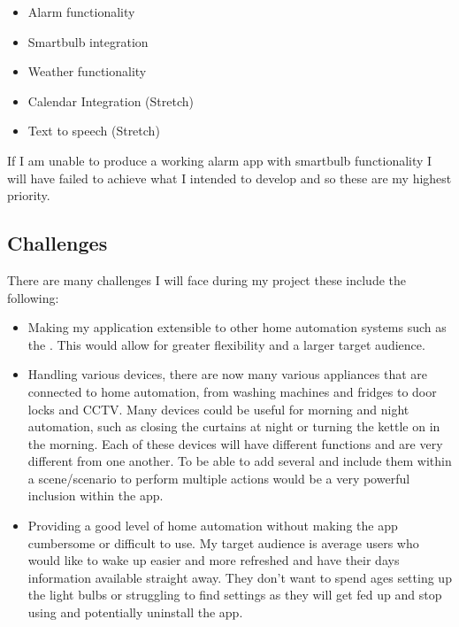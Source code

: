 \begin{itemize}
\tightlist
\item
  Alarm functionality
\item
  Smartbulb integration
\item
  Weather functionality
\item
  Calendar Integration (Stretch)
\item
  Text to speech (Stretch)
\end{itemize}

If I am unable to produce a working alarm app with smartbulb
functionality I will have failed to achieve what I intended to develop
and so these are my highest priority.

\subsection{Challenges}\label{challenges}

There are many challenges I will face during my project these include
the following:

\begin{itemize}
\item
  Making my application extensible to other home automation systems such
  as the \cite{belkinwemo}. This would allow for greater flexibility and
  a larger target audience.
\item
  Handling various devices, there are now many various appliances that
  are connected to home automation, from washing machines and fridges to
  door locks and CCTV. Many devices could be useful for morning and
  night automation, such as closing the curtains at night or turning the
  kettle on in the morning. Each of these devices will have different
  functions and are very different from one another. To be able to add
  several and include them within a scene/scenario to perform multiple
  actions would be a very powerful inclusion within the app.
\item
  Providing a good level of home automation without making the app
  cumbersome or difficult to use. My target audience is average users
  who would like to wake up easier and more refreshed and have their
  days information available straight away. They don't want to spend
  ages setting up the light bulbs or struggling to find settings as they
  will get fed up and stop using and potentially uninstall the app.
\end{itemize}
